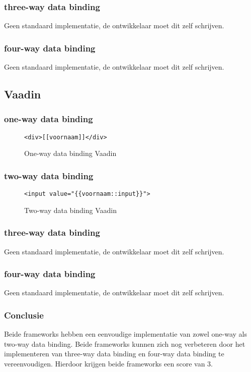 \subsubsection{three-way data binding}
Geen standaard implementatie, de ontwikkelaar moet dit zelf schrijven.

\subsubsection{four-way data binding}
Geen standaard implementatie, de ontwikkelaar moet dit zelf schrijven.
\subsection{Vaadin}
\subsubsection{one-way data binding}

\begin{figure}[H]
\begin{lstlisting}
<div>[[voornaam]]</div>
\end{lstlisting}
\caption{One-way data binding Vaadin}
\end{figure}
\subsubsection{two-way data binding}
\begin{figure}[H]
\begin{lstlisting}
<input value="{{voornaam::input}}">
\end{lstlisting}
\caption{Two-way data binding Vaadin}
\end{figure}

\subsubsection{three-way data binding}
Geen standaard implementatie, de ontwikkelaar moet dit zelf schrijven.
\subsubsection{four-way data binding}
Geen standaard implementatie, de ontwikkelaar moet dit zelf schrijven.

\subsubsection{Conclusie}
Beide frameworks hebben een eenvoudige implementatie van zowel one-way als two-way data binding. Beide frameworks kunnen zich nog verbeteren door het implementeren van three-way data binding en four-way data binding te vereenvoudigen. Hierdoor krijgen beide frameworks een score van 3. 

